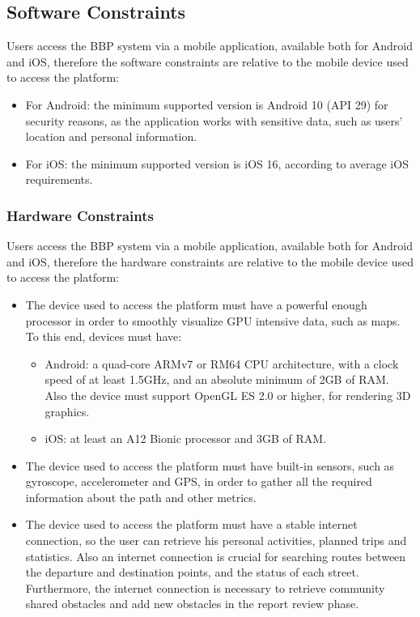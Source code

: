 \subsection{Software Constraints} \label{s: software_constraints}
Users access the BBP system via a mobile application, available both for Android and iOS, therefore the software constraints are relative to the mobile device used to access the platform:
\begin{itemize}
    \item For Android: the minimum supported version is Android 10 (API 29) for security reasons, as the application works with sensitive data, such as users' location and personal information.
    \item For iOS: the minimum supported version is iOS 16, according to average iOS requirements.
\end{itemize}

\subsubsection{Hardware Constraints}
Users access the BBP system via a mobile application, available both for Android and iOS, therefore the hardware constraints are relative to the mobile device used to access the platform:
\begin{itemize}
    \item The device used to access the platform must have a powerful enough processor in order to smoothly visualize GPU intensive data, such as maps. To this end, devices must have:
    \begin{itemize}
        \item Android: a quad-core ARMv7 or RM64 CPU architecture, with a clock speed of at least 1.5GHz, and an absolute minimum of 2GB of RAM. Also the device must support OpenGL ES 2.0 or higher, for rendering 3D graphics.
        \item iOS: at least an A12 Bionic processor and 3GB of RAM.
    \end{itemize}
    \item The device used to access the platform must have built-in sensors, such as gyroscope, accelerometer and GPS, in order to gather all the required information about the path and other metrics.
    \item The device used to access the platform must have a stable internet connection, so the user can retrieve his personal activities, planned trips and statistics. Also an internet connection is crucial for searching routes between the departure and destination points, and the status of each street. Furthermore, the internet connection is necessary to retrieve community shared obstacles and add new obstacles in the report review phase.
\end{itemize}

